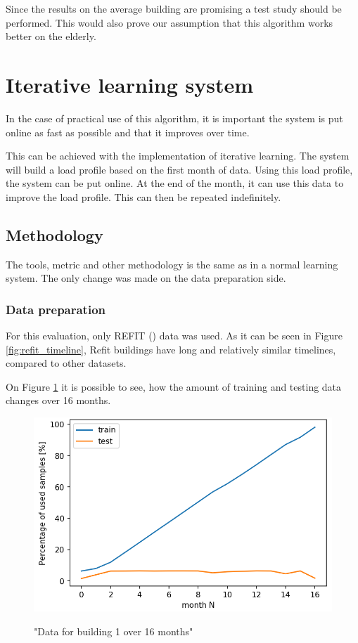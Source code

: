 Since the results on the average building are promising
a test study should be performed. 
This would also prove our assumption that this algorithm works 
better on the elderly.

\section{Iterative learning system}

In the case of practical use of this algorithm, it is 
important the system is put online as fast as possible and that it improves over time. 

This can be achieved with the implementation of iterative learning.
The system will build a load profile based on the first month of data.
Using this load profile, the system can be put online.
At the end of the month, it can use this data to improve the load profile.
This can then be repeated indefinitely. 

\subsection{Methodology}
The tools, metric and other methodology is the same as in a normal learning system.
The only change was made on the data preparation side.

\subsubsection{Data preparation}
For this evaluation, only REFIT (\cite{REFIT}) data was used. 
As it can be seen in Figure \ref{fig:refit_timeline},
Refit buildings have long and relatively similar timelines,
compared to other datasets.

On Figure \ref{fig:dyn_data_1} it is possible to see,
how the amount of training and testing data changes over 16 months.

\begin{figure}[H]
	\centering
	\caption{"Data for building 1 over 16 months"}
	\includegraphics[width=.7\textwidth]{Figures/EC/DYN/tst_tr_b1.png}
	\label{fig:dyn_data_1}
\end{figure}

